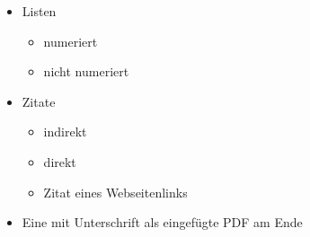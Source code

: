 \begin{itemize}
    \item Listen 
        \begin{itemize}
            \item numeriert
            \item nicht numeriert
        \end{itemize}
    \item Zitate 
        \begin{itemize}
            \item indirekt
            \item direkt 
            \item Zitat eines Webseitenlinks
        \end{itemize}
    \item Eine  mit Unterschrift als eingefügte PDF am Ende
\end{itemize}